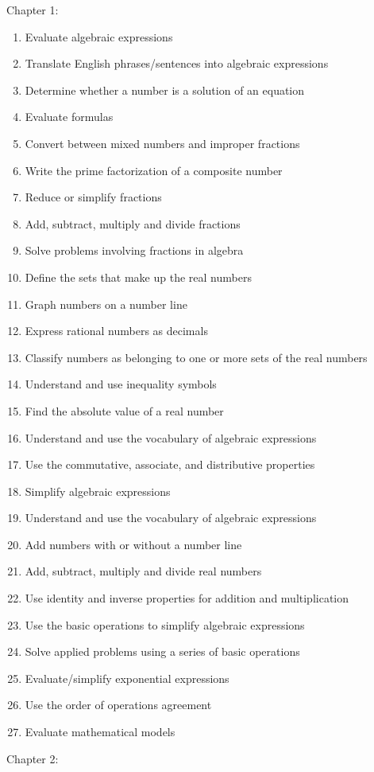 \documentclass[11pt]{article}
\newenvironment{alphalist}{
  \begin{enumerate}[(1)]
    \addtolength{\itemsep}{-1.0\itemsep}}
  {\end{enumerate}}
\begin{document}
\noindent Chapter 1:
\begin{alphalist}
    \item Evaluate algebraic expressions
    \item Translate English phrases/sentences into algebraic expressions
    \item Determine whether a number is a solution of an equation
    \item Evaluate formulas
    \item Convert between mixed numbers and improper fractions
    \item Write the prime factorization of a composite number
    \item Reduce or simplify fractions
    \item Add, subtract, multiply and divide fractions
    \item Solve problems involving fractions in algebra
    \item Define the sets that make up the real numbers
    \item Graph numbers on a number line
    \item Express rational numbers as decimals
    \item Classify numbers as belonging to one or more sets of the real numbers
    \item Understand and use inequality symbols
    \item Find the absolute value of a real number
    \item Understand and use the vocabulary of algebraic expressions
    \item Use the commutative, associate, and distributive properties
    \item Simplify algebraic expressions
    \item Understand and use the vocabulary of algebraic expressions
    \item Add numbers with or without a number line
    \item Add, subtract, multiply and divide real numbers
    \item Use identity and inverse properties for addition and multiplication 
    \item Use the basic operations to simplify algebraic expressions 
    \item Solve applied problems using a series of basic operations
    \item Evaluate/simplify exponential expressions
    \item Use the order of operations agreement
    \item Evaluate mathematical models
\end{alphalist}
\noindent Chapter 2:
 
\end{document}
